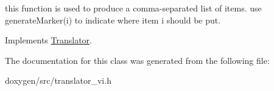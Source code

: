 this function is used to produce a comma-\/separated list of items. use generate\+Marker(i) to indicate where item i should be put. 

Implements \mbox{\hyperlink{class_translator}{Translator}}.



The documentation for this class was generated from the following file\+:\begin{DoxyCompactItemize}
\item 
doxygen/src/translator\+\_\+vi.\+h\end{DoxyCompactItemize}
